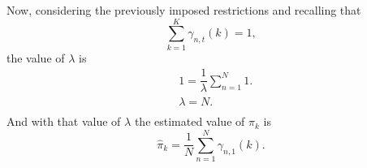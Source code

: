 \documentclass[12pt]{article}
\begin{document}
Now, considering the previously imposed restrictions and recalling that
\begin{equation}
\sum _ { k = 1 } ^ { K } \gamma _ { n , t } ( k ) = 1,
\end{equation}
the value of $\lambda$ is
\begin{equation}
\begin{split}
& 1 = \dfrac{1}{\lambda} \sum \limits_{n=1}^{N}1.\\
& \lambda = N.\\
\end{split}
\end{equation}
And with that value of $\lambda$ the estimated value of $\pi_{k}$ is
\begin{equation}
\widehat{\pi}_{k} = \dfrac{1}{N} \sum \limits_{n=1}^{N} \gamma_{n,1}(k).
\end{equation}
\end{document}
